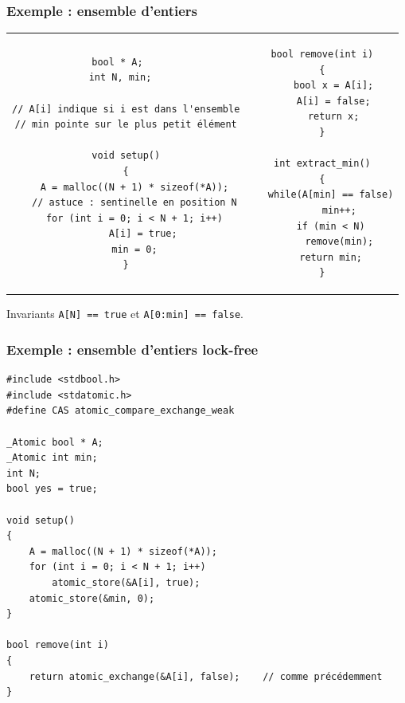 \documentclass[xcolor={x11names,svgnames},x11names,svgnames]{beamer}
\begin{document}
\begin{frame}[fragile,label=seq_intset]
  \frametitle{Exemple : ensemble d'entiers}

  \begin{tabular}{c|c}
\begin{minipage}[t]{0.55\textwidth}
\begin{verbatim}
bool * A;   
int N, min;  

// A[i] indique si i est dans l'ensemble
// min pointe sur le plus petit élément

void setup()
{
   A = malloc((N + 1) * sizeof(*A));
   // astuce : sentinelle en position N
   for (int i = 0; i < N + 1; i++)
      A[i] = true;
   min = 0;
}
\end{verbatim}
\end{minipage}
  &
\begin{minipage}[t]{0.45\textwidth}
\begin{verbatim}
bool remove(int i)
{
    bool x = A[i];
    A[i] = false;
    return x;
}

int extract_min()
{
   while(A[min] == false)
      min++;
   if (min < N)
      remove(min);
   return min;
}
\end{verbatim}
\end{minipage}
  \end{tabular}

\begin{alertblock}{Invariants}
  \texttt{A[N] == true} et \texttt{A[0:min] == false}.
\end{alertblock}
\end{frame}


\begin{frame}[fragile,label=lf_intset]
  \frametitle{Exemple : ensemble d'entiers \alert{lock-free}}
  
\begin{verbatim}
#include <stdbool.h>
#include <stdatomic.h>
#define CAS atomic_compare_exchange_weak

_Atomic bool * A;         
_Atomic int min;          
int N;
bool yes = true;

void setup()
{
    A = malloc((N + 1) * sizeof(*A));
    for (int i = 0; i < N + 1; i++)
        atomic_store(&A[i], true);
    atomic_store(&min, 0);
}

bool remove(int i)
{
    return atomic_exchange(&A[i], false);    // comme précédemment
}
\end{verbatim}
\end{frame}
\end{document}
